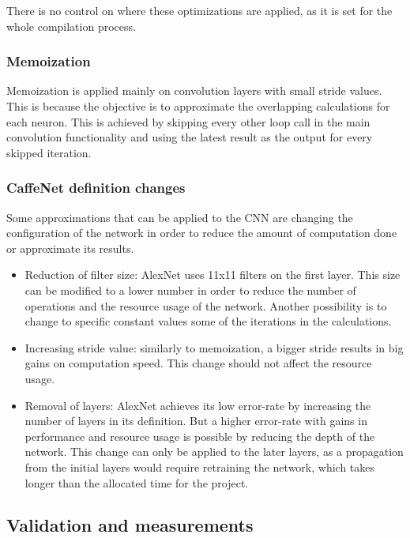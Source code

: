 \begin{enumerate}
There is no control on where these optimizations are applied, as it is set for the whole
compilation process.

\subsubsection{Memoization}

Memoization \cite{michie1968memo} is applied mainly on convolution layers with small stride values. This is because
the objective is to approximate the overlapping calculations for each neuron. This is achieved
by skipping every other loop call in the main convolution functionality and using the latest
result as the output for every skipped iteration.

\subsubsection{CaffeNet definition changes}

Some approximations that can be applied to the CNN are changing the configuration of the network
in order to reduce the amount of computation done or approximate its results.

\begin{itemize}
    \item Reduction of filter size: AlexNet uses 11{x}11 filters on the first layer. This size
    can be modified to a lower number in order to reduce the number of operations and the
    resource usage of the network. Another
    possibility is to change to specific constant values some of the iterations in the calculations.
    \item Increasing stride value: similarly to memoization, a bigger stride results in big gains
    on computation speed. This change should not affect the resource usage.
    \item Removal of layers: AlexNet achieves its low error-rate by increasing the number of layers
    in its definition. But a higher error-rate with gains in performance and resource usage is
    possible by reducing the depth of the network. This change can only be applied to the later
    layers, as a propagation from the initial layers would require retraining the network, which
    takes longer than the allocated time for the project.
\end{itemize}

\subsection{Validation and measurements}


\end{enumerate}
